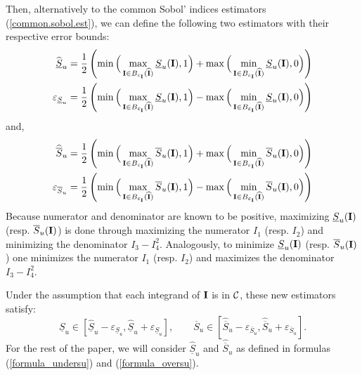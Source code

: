 Then, alternatively to the common Sobol' indices estimators (\ref{common.sobol.est}), we can define the following two estimators with their respective error bounds:
\begin{gather}
\begin{aligned}
\widehat{\underline{S}}_u & = \frac{1}{2}\left(\min\Big{(}\max_{\boldsymbol{\mathbf{I}}\in B_{\varepsilon_{\boldsymbol{\mathbf{I}}}}(\widehat{\boldsymbol{\mathbf{I}}})} \underline{S}_u(\boldsymbol{\mathbf{I}}),1\Big{)} + \max\Big{(}\min_{\boldsymbol{\mathbf{I}}\in B_{\varepsilon_{\boldsymbol{\mathbf{I}}}}(\widehat{\boldsymbol{\mathbf{I}}})} \underline{S}_u(\boldsymbol{\mathbf{I}}),0\Big{)} \right) \\
\varepsilon_{\underline{S}_u} & = \frac{1}{2}\left(\min\Big{(}\max_{\boldsymbol{\mathbf{I}}\in B_{\varepsilon_{\boldsymbol{\mathbf{I}}}}(\widehat{\boldsymbol{\mathbf{I}}})} \underline{S}_u(\boldsymbol{\mathbf{I}}),1\Big{)} - \max\Big{(}\min_{\boldsymbol{\mathbf{I}}\in B_{\varepsilon_{\boldsymbol{\mathbf{I}}}}(\widehat{\boldsymbol{\mathbf{I}}})} \underline{S}_u(\boldsymbol{\mathbf{I}}),0\Big{)} \right)
\end{aligned}
\label{formula_undersu}
\end{gather}
and,
\begin{gather}
\begin{aligned}
\widehat{\overline{S}}_u & = \frac{1}{2}\left(\min\Big{(}\max_{\boldsymbol{\mathbf{I}}\in B_{\varepsilon_{\boldsymbol{\mathbf{I}}}}(\widehat{\boldsymbol{\mathbf{I}}})} \overline{S}_u(\boldsymbol{\mathbf{I}}),1\Big{)} + \max\Big{(}\min_{\boldsymbol{\mathbf{I}}\in B_{\varepsilon_{\boldsymbol{\mathbf{I}}}}(\widehat{\boldsymbol{\mathbf{I}}})} \overline{S}_u(\boldsymbol{\mathbf{I}}),0\Big{)} \right) \\
\varepsilon_{\overline{S}_u} & = \frac{1}{2}\left(\min\Big{(}\max_{\boldsymbol{\mathbf{I}}\in B_{\varepsilon_{\boldsymbol{\mathbf{I}}}}(\widehat{\boldsymbol{\mathbf{I}}})} \overline{S}_u(\boldsymbol{\mathbf{I}}),1\Big{)} - \max\Big{(}\min_{\boldsymbol{\mathbf{I}}\in B_{\varepsilon_{\boldsymbol{\mathbf{I}}}}(\widehat{\boldsymbol{\mathbf{I}}})} \overline{S}_u(\boldsymbol{\mathbf{I}}),0\Big{)} \right)
\end{aligned}
\label{formula_oversu}
\end{gather}
Because numerator and denominator are known to be positive, maximizing $\underline{S}_u(\boldsymbol{\mathbf{I}})$ (resp. $\overline{S}_u(\boldsymbol{\mathbf{I}})$) is done through maximizing the numerator $I_1$ (resp. $I_2$) and minimizing the denominator $I_3-I_4^2$. Analogously, to minimize $\underline{S}_u(\boldsymbol{\mathbf{I}})$ (resp. $\overline{S}_u(\boldsymbol{\mathbf{I}})$) one minimizes the numerator $I_1$ (resp. $I_2$) and maximizes the denominator $I_3-I_4^2$. %

Under the assumption that each integrand of $\boldsymbol{\mathbf{I}}$ is in $\mathcal{C}$, these new estimators satisfy: \[ \underline{S}_u\in \left[ \widehat{\underline{S}}_u - \varepsilon_{\underline{S}_u}, \widehat{\underline{S}}_u + \varepsilon_{\underline{S}_u} \right], \qquad \overline{S}_u\in \left[ \widehat{\overline{S}}_u - \varepsilon_{\overline{S}_u}, \widehat{\overline{S}}_u + \varepsilon_{\overline{S}_u} \right] .\]
For the rest of the paper, we will consider $\widehat{\underline{S}}_u$ and $\widehat{\overline{S}}_u$   as defined in formulas (\ref{formula_undersu}) and (\ref{formula_oversu}).

